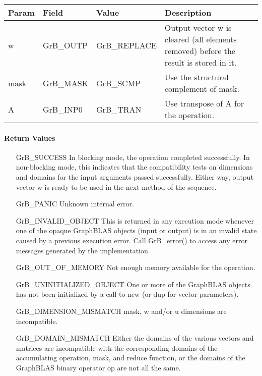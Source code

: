 \begin{itemize}[leftmargin=1.1in]
    \begin{tabular}{lllp{2.5in}}
        Param & Field  & Value & Description \\
        \hline
        {\sf w}    & {\sf GrB\_OUTP} & {\sf GrB\_REPLACE} & Output vector {\sf w}
        is cleared (all elements removed) before the result is stored in it.\\

        {\sf mask} & {\sf GrB\_MASK} & {\sf GrB\_SCMP}   & Use the structural
        complement of {\sf mask}. \\

        {\sf A}    & {\sf GrB\_INP0} & {\sf GrB\_TRAN}   & Use transpose of {\sf A}
        for the operation. \\
    \end{tabular}
\end{itemize}

\paragraph{Return Values}

\begin{itemize}[leftmargin=2.1in]
    \item[{\sf GrB\_SUCCESS}]         In blocking mode, the operation completed
    successfully. In non-blocking mode, this indicates that the compatibility 
    tests on dimensions and domains for the input arguments passed successfully. 
    Either way, output vector {\sf w} is ready to be used in the next method of 
    the sequence.

    \item[{\sf GrB\_PANIC}]           Unknown internal error.

    \item[{\sf GrB\_INVALID\_OBJECT}] This is returned in any execution mode 
    whenever one of the opaque GraphBLAS objects (input or output) is in an invalid 
    state caused by a previous execution error.  Call {\sf GrB\_error()} to access 
    any error messages generated by the implementation.

    \item[{\sf GrB\_OUT\_OF\_MEMORY}] Not enough memory available for the operation.

    \item[{\sf GrB\_UNINITIALIZED\_OBJECT}] One or more of the GraphBLAS objects
    has not been initialized by a call to {\sf new} (or {\sf dup} for vector
    parameters).
    
    \item[{\sf GrB\_DIMENSION\_MISMATCH}]  {\sf mask}, {\sf w} and/or {\sf u} dimensions are
    incompatible. 

    \item[{\sf GrB\_DOMAIN\_MISMATCH}]    Either the domains of the various vectors and matrices are
    incompatible with the corresponding domains of the accumulating operation, 
    mask, and reduce function, or the domains of the GraphBLAS binary operator {\sf op} are not all the same.
\end{itemize}

